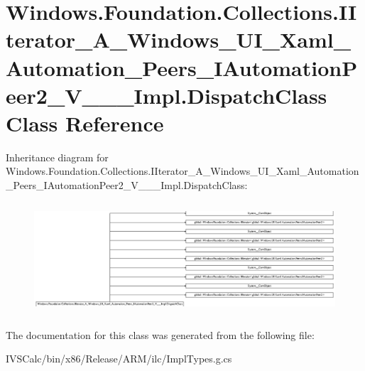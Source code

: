 \hypertarget{class_windows_1_1_foundation_1_1_collections_1_1_i_iterator___a___windows___u_i___xaml___automat9e22ec4e6083064b5fc29dfae29335a9}{}\section{Windows.\+Foundation.\+Collections.\+I\+Iterator\+\_\+\+A\+\_\+\+Windows\+\_\+\+U\+I\+\_\+\+Xaml\+\_\+\+Automation\+\_\+\+Peers\+\_\+\+I\+Automation\+Peer2\+\_\+\+V\+\_\+\+\_\+\+\_\+\+Impl.\+Dispatch\+Class Class Reference}
\label{class_windows_1_1_foundation_1_1_collections_1_1_i_iterator___a___windows___u_i___xaml___automat9e22ec4e6083064b5fc29dfae29335a9}
Inheritance diagram for Windows.\+Foundation.\+Collections.\+I\+Iterator\+\_\+\+A\+\_\+\+Windows\+\_\+\+U\+I\+\_\+\+Xaml\+\_\+\+Automation\+\_\+\+Peers\+\_\+\+I\+Automation\+Peer2\+\_\+\+V\+\_\+\+\_\+\+\_\+\+Impl.\+Dispatch\+Class\+:\begin{figure}[H]
\begin{center}
\leavevmode
\includegraphics[height=4.196185cm]{class_windows_1_1_foundation_1_1_collections_1_1_i_iterator___a___windows___u_i___xaml___automat9e22ec4e6083064b5fc29dfae29335a9}
\end{center}
\end{figure}


The documentation for this class was generated from the following file\+:\begin{DoxyCompactItemize}
\item 
I\+V\+S\+Calc/bin/x86/\+Release/\+A\+R\+M/ilc/Impl\+Types.\+g.\+cs\end{DoxyCompactItemize}
